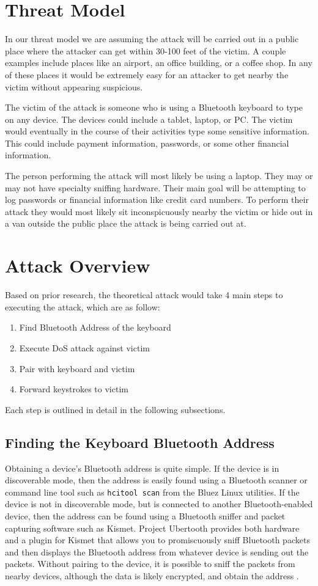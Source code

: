 \documentclass{acm_proc_article-sp}
\begin{document}
\section{Threat Model}
In our threat model we are assuming the attack will be carried out in a public place where the attacker
can get within 30-100 feet of the victim. A couple examples include places like an airport, an office building, or a coffee shop. In any of these places it would be extremely easy for an attacker to get nearby the victim without appearing suspicious.

The victim of the attack is someone who is using a Bluetooth keyboard to type on any device. The devices could include a tablet, laptop, or PC. The victim would eventually in the course of their activities type some sensitive information. This could include payment information, passwords, or some other financial information. 

The person performing the attack will most likely be using a laptop. They may or may not have specialty sniffing hardware. Their main goal will be attempting to log passwords or financial information like credit card numbers. To perform their attack they would most likely sit inconspicuously nearby the victim or hide out in a van outside the public place the attack is being carried out at.

\section{Attack Overview}
Based on prior research, the theoretical attack would take 4 main steps to executing the attack, which are as follow:
\begin{enumerate}
\item Find Bluetooth Address of the keyboard
\item Execute DoS attack against victim
\item Pair with keyboard and victim
\item Forward keystrokes to victim
\end{enumerate}

Each step is outlined in detail in the following subsections.

\subsection{Finding the Keyboard Bluetooth Address}
Obtaining a device's Bluetooth address is quite simple. If the device is in discoverable mode, then the address is easily found using a Bluetooth scanner or command line tool such as \texttt{hcitool scan} from the Bluez Linux utilities. If the device is not in discoverable mode, but is connected to another Bluetooth-enabled device, then the address can be found using a Bluetooth sniffer and packet capturing software such as Kismet\cite{kismet}. Project Ubertooth \cite{ubertooth} provides both hardware and a plugin for Kismet that allows you to promiscuously sniff Bluetooth packets and then displays the Bluetooth address from whatever device is sending out the packets. Without pairing to the device, it is possible to sniff the packets from nearby devices, although the data is likely encrypted, and obtain the address \cite{hak5}. 
\end{document}
